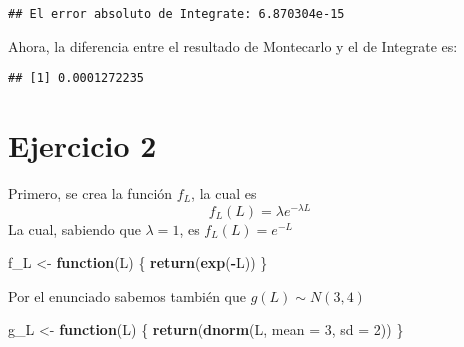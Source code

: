 \documentclass[
]{article}
\newenvironment{Shaded}{\begin{snugshade}}{\end{snugshade}}
\newcommand{\AttributeTok}[1]{\textcolor[rgb]{0.13,0.29,0.53}{#1}}
\newcommand{\ControlFlowTok}[1]{\textcolor[rgb]{0.13,0.29,0.53}{\textbf{#1}}}
\newcommand{\DecValTok}[1]{\textcolor[rgb]{0.00,0.00,0.81}{#1}}
\newcommand{\FunctionTok}[1]{\textcolor[rgb]{0.13,0.29,0.53}{\textbf{#1}}}
\newcommand{\NormalTok}[1]{#1}
\newcommand{\OtherTok}[1]{\textcolor[rgb]{0.56,0.35,0.01}{#1}}
\newcommand{\SpecialCharTok}[1]{\textcolor[rgb]{0.81,0.36,0.00}{\textbf{#1}}}
\newcommand{\StringTok}[1]{\textcolor[rgb]{0.31,0.60,0.02}{#1}}
\begin{document}
\begin{Shaded}
\end{Shaded}

\begin{verbatim}
## El error absoluto de Integrate: 6.870304e-15
\end{verbatim}

Ahora, la diferencia entre el resultado de Montecarlo y el de Integrate
es:

\begin{Shaded}
\end{Shaded}

\begin{verbatim}
## [1] 0.0001272235
\end{verbatim}

\section{Ejercicio 2}\label{ejercicio-2}

Primero, se crea la función \(f_L\), la cual es \[
f_L(L)= \lambda e^{-\lambda L}
\] La cual, sabiendo que \(\lambda = 1\), es \(f_L(L)= e^{-L}\)

\begin{Shaded}
\begin{Highlighting}[]
\NormalTok{f\_L }\OtherTok{\textless{}{-}} \ControlFlowTok{function}\NormalTok{(L) \{}
  \FunctionTok{return}\NormalTok{(}\FunctionTok{exp}\NormalTok{(}\SpecialCharTok{{-}}\NormalTok{L)) }
\NormalTok{\}}
\end{Highlighting}
\end{Shaded}

Por el enunciado sabemos también que \(g(L) \sim N(3, 4)\)

\begin{Shaded}
\begin{Highlighting}[]
\NormalTok{g\_L }\OtherTok{\textless{}{-}} \ControlFlowTok{function}\NormalTok{(L) \{}
  \FunctionTok{return}\NormalTok{(}\FunctionTok{dnorm}\NormalTok{(L, }\AttributeTok{mean =} \DecValTok{3}\NormalTok{, }\AttributeTok{sd =} \DecValTok{2}\NormalTok{))}
\NormalTok{\}}
\end{Highlighting}
\end{Shaded}
\end{document}
